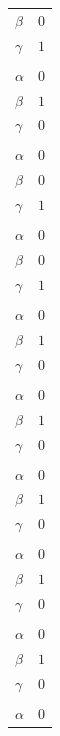 \documentclass[11pt]{article}
\begin{document}
\begin{longtable}{@{}ll@{}}
$\beta$ & $0$\\
$\gamma$ & $1$\\
\addlinespace[3pt]
\multicolumn{2}{@{}l}{$\{i,j\}=\{194,195\}$, $k_{ij}=2^{2}\cdot 3\cdot 5^{2}$}\\
$\alpha$ & $0$\\
$\beta$ & $1$\\
$\gamma$ & $0$\\
\addlinespace[3pt]
\multicolumn{2}{@{}l}{$\{i,j\}=\{197,198\}$, $k_{ij}=2^{2}\cdot 3\cdot 7$}\\
$\alpha$ & $0$\\
$\beta$ & $0$\\
$\gamma$ & $1$\\
\addlinespace[3pt]
\multicolumn{2}{@{}l}{$\{i,j\}=\{201,202\}$, $k_{ij}=3$}\\
$\alpha$ & $0$\\
$\beta$ & $0$\\
$\gamma$ & $1$\\
\addlinespace[3pt]
\multicolumn{2}{@{}l}{$\{i,j\}=\{202,205\}$, $k_{ij}=3$}\\
$\alpha$ & $0$\\
$\beta$ & $1$\\
$\gamma$ & $0$\\
\addlinespace[3pt]
\multicolumn{2}{@{}l}{$\{i,j\}=\{202,207\}$, $k_{ij}=3$}\\
$\alpha$ & $0$\\
$\beta$ & $1$\\
$\gamma$ & $0$\\
\addlinespace[3pt]
\multicolumn{2}{@{}l}{$\{i,j\}=\{202,209\}$, $k_{ij}=3$}\\
$\alpha$ & $0$\\
$\beta$ & $1$\\
$\gamma$ & $0$\\
\addlinespace[3pt]
\multicolumn{2}{@{}l}{$\{i,j\}=\{202,214\}$, $k_{ij}=3$}\\
$\alpha$ & $0$\\
$\beta$ & $1$\\
$\gamma$ & $0$\\
\addlinespace[3pt]
\multicolumn{2}{@{}l}{$\{i,j\}=\{202,215\}$, $k_{ij}=3$}\\
$\alpha$ & $0$\\
$\beta$ & $1$\\
$\gamma$ & $0$\\
\addlinespace[3pt]
\multicolumn{2}{@{}l}{$\{i,j\}=\{202,219\}$, $k_{ij}=3$}\\
$\alpha$ & $0$\\

\end{longtable}
\end{document}
